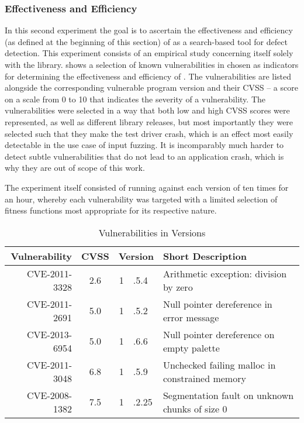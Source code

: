 \subsubsection{Effectiveness and Efficiency}
In this second experiment the goal is to ascertain the effectiveness and efficiency (as defined at the
beginning of this section) of \xmlmate as a search-based tool for defect detection. This experiment consists of
an empirical study concerning itself solely with the \libpng library.  shows a selection of known vulnerabilities in \libpng
chosen as indicators for determining the effectiveness and efficiency of \xmlmate. The vulnerabilities are
listed alongside the corresponding vulnerable program version and their CVSS -- a score on a scale from 0 to 10
that indicates the severity of a vulnerability.
The vulnerabilities were selected in a way that both low and high CVSS scores were represented, as well as
different library releases, but most importantly they were selected such that they make the test driver crash,
which is an effect most easily detectable in the use case of input fuzzing. It is incomparably much harder to
detect subtle vulnerabilities that do not lead to an application crash, which is why they are out of scope of
this work.

The experiment itself consisted of running \xmlmate against each version of \libpng ten times for an hour,
whereby each vulnerability was targeted with a limited selection of fitness functions most appropriate for
its respective nature.

\begin{table}[H]
\centering
\begin{tabular}{|r|c|r@{}l|l|}
\hline
Vulnerability & CVSS  & \multicolumn{2}{c|}{Version} & Short Description \\ \hline \hline 
CVE-2011-3328 & 2.6   & 1&.5.4 	& Arithmetic exception: division by zero   \\ \hline  %
CVE-2011-2691 & 5.0   & 1&.5.2	& Null pointer dereference in error message \\ \hline %
CVE-2013-6954 & 5.0   & 1&.6.6  & Null pointer dereference on empty palette \\ \hline %
CVE-2011-3048 & 6.8   & 1&.5.9  & Unchecked failing malloc in constrained memory \\ \hline %
CVE-2008-1382 & 7.5   & 1&.2.25 & Segmentation fault on unknown chunks of size 0\\ \hline %
\end{tabular}
\caption{Vulnerabilities in \libpng Versions}
\label{tbl:png:vulns}
\end{table}

